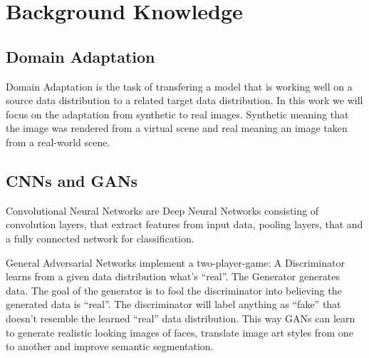 \chapter{Background Knowledge}

\section{Domain Adaptation}
Domain Adaptation is the task of transfering a model that is working well on a source data distribution to a related target data distribution. In this work we will focus on the adaptation from synthetic to real images. Synthetic meaning that the image was rendered from a virtual scene and real meaning an image taken from a real-world scene. 


\section{CNNs and GANs}

Convolutional Neural Networks are Deep Neural Networks consisting of convolution layers, that extract features from input data, pooling layers, that  and a fully connected network for classification. 

General Adversarial Networks implement a two-player-game:
A Discriminator learns from a given data distribution what's ``real''. The Generator generates data. The goal of the generator is to fool the discriminator into believing the generated data is ``real''. The discriminator will label anything as ``fake'' that doesn't resemble the learned ``real'' data distribution. This way GANs can learn to generate realistic looking images of faces, translate image art styles from one to another and improve semantic segmentation.


